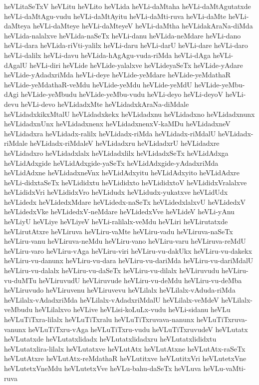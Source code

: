 {heVLitaSeTxV
heVLitu
heVLito
heVLida
heVLi-daMtaha
heVLi-daMtAgutatxde
heVLi-daMtAgu-vudu
heVLi-daMtAyitu
heVLi-daMti-ruva
heVLi-daMte
heVLi-daMteya
heVLi-daMteye
heVLi-daMteyeV
heVLi-daMtha
heVLidakAraNa-diMda
heVLida-nalalxve
heVLida-naSeTx
heVLi-danu
heVLida-neMdare
heVLi-dano
heVLi-dara
heVLida-riVti-yalilx
heVLi-daru
heVLi-darU
heVLi-dare
heVLi-daro
heVLi-dalilx
heVLi-davu
heVLida-hAgAgu-vuda-riMda
heVLi-dAga
heVLi-dAgalU
heVLi-diri
heVLide
heVLide-yalalxve
heVLideyaSeTx
heVLide-yAdare
heVLide-yAdadxriMda
heVLi-deye
heVLide-yeMdare
heVLide-yeMdathaR
heVLide-yeMdathaR-veMdu
heVLide-yeMdu
heVLide-yeMdU
heVLide-yeMbu-dAgi
heVLide-yeMbudu
heVLide-yeMbu-vudu
heVLi-deyo
heVLi-deyoV
heVLi-devu
heVLi-devo
heVLidadxMte
heVLidadxkAraNa-diMdale
heVLidadxkikxMtalU
heVLidadxkekx
heVLidadxnu
heVLidadxno
heVLidadxnunx
heVLidadxnUnx
heVLidadxnenx
heVLidadxnenxV-kaMDu
heVLidadxneV
heVLidadxra
heVLidadx-ralilx
heVLidadx-riMda
heVLidadx-riMdalU
heVLidadx-riMdale
heVLidadx-riMdaleV
heVLidadxru
heVLidadxrU
heVLidadxre
heVLidadxro
heVLidadxlalx
heVLidadxlilx
heVLidadxSeTx
heVLidAdxga
heVLidAdxgide
heVLidAdxgide-yaSeTx
heVLidAdxgide-yAdadxriMda
heVLidAdxne
heVLidadxneVnx
heVLidAdxyitu
heVLidAdxyito
heVLidAdxre
heVLi-didxtaSeTx
heVLididxtu
heVLididxto
heVLididxtoV
heVLididxVralalxve
heVLididxVri
heVLididxVro
heVLidudx
heVLidudx-yukatxve
heVLidUdx
heVLidedx
heVLidedxMdare
heVLidedx-naSeTx
heVLidedxlalxvU
heVLidedxV
heVLidedxVke
heVLidedxV-neMdare
heVLidedxVve
heVLideV
heVLi-yAnu
heVLiyU
heVLiye
heVLiyeV
heVLi-ralilalx-veMdu
heVLiri
heVLirutatxde
heVLirutAtxre
heVLiruva
heVLiru-vaMte
heVLiru-vadu
heVLiruva-naSeTx
heVLiru-vanu
heVLiruva-neMdu
heVLiru-vano
heVLiru-varu
heVLiruva-reMdU
heVLiru-varo
heVLiru-vAga
heVLiru-viri
heVLiru-vu-dakUkx
heVLiru-vu-dakekx
heVLiru-vu-danunx
heVLiru-vu-dara
heVLiru-vu-dariMda
heVLiru-vu-dariMdalU
heVLiru-vu-dalalx
heVLiru-vu-daSeTx
heVLiru-vu-dilalx
heVLiruvudu
heVLiru-vu-duMTu
heVLiruvudU
heVLiruvude
heVLiru-vu-deMdu
heVLiru-vu-deMba
heVLiruvudo
heVLiruvenu
heVLiruvevu
heVLilalx
heVLilalx-vAduda-riMda
heVLilalx-vAdadxriMda
heVLilalx-vAdadxriMdalU
heVLilalx-veMdeV
heVLilalx-veMbudu
heVLilalxvo
heVLive
heVLisi-koLuLx-vudu
heVLi-sidanu
heVLu
heVLuTiTxra-lilalx
heVLuTiTxralu
heVLuTiTxruvava-nanunx
heVLuTiTxruva-vanunx
heVLuTiTxru-vAga
heVLuTiTxru-vudu
heVLuTiTxruvudeV
heVLutatx
heVLutatxde
heVLutatxlidadx
heVLutatxlidadxru
heVLutatxlididxtu
heVLutatxlira-lilalx
heVLutatxve
heVLutAtx
heVLutAtxne
heVLutAtx-raSeTx
heVLutAtxre
heVLutAtx-reMdathaR
heVLutitxve
heVLutitxVri
heVLutetxVne
heVLutetxVneMdu
heVLutetxVve
heVLu-bahu-daSeTx
heVLuva
heVLu-vaMti-ruva
}

